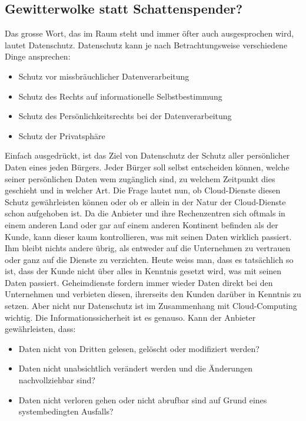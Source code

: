 \subsection{Gewitterwolke statt Schattenspender?}
Das grosse Wort, das im Raum steht und immer öfter auch ausgesprochen wird, lautet Datenschutz. Datenschutz kann je nach Betrachtungsweise verschiedene Dinge ansprechen:

\begin{itemize}
\item Schutz vor missbräuchlicher Datenverarbeitung
\item Schutz des Rechts auf informationelle Selbstbestimmung
\item Schutz des Persönlichkeitsrechts bei der Datenverarbeitung
\item Schutz der Privatsphäre
\end{itemize}

Einfach ausgedrückt, ist das Ziel von Datenschutz der Schutz aller persönlicher Daten eines jeden Bürgers. Jeder Bürger soll selbst entscheiden können, welche seiner persönlichen Daten wem zugänglich sind, zu welchem Zeitpunkt dies geschieht und in welcher Art. Die Frage lautet nun, ob Cloud-Dienste diesen Schutz gewährleisten können oder ob er allein in der Natur der Cloud-Dienste schon aufgehoben ist. Da die Anbieter und ihre Rechenzentren sich oftmals in einem anderen Land oder gar auf einem anderen Kontinent befinden als der Kunde, kann dieser kaum kontrollieren, was mit seinen Daten wirklich passiert. Ihm bleibt nichts andere übrig, als entweder auf die Unternehmen zu vertrauen oder ganz auf die Dienste zu verzichten. Heute weiss man, dass es tatsächlich so ist, dass der Kunde nicht über alles in Kenntnis gesetzt wird, was mit seinen Daten passiert. Geheimdienste fordern immer wieder Daten direkt bei den Unternehmen und verbieten diesen, ihrerseits den Kunden darüber in Kenntnis zu setzen. Aber nicht nur Datenschutz ist im Zusammenhang mit Cloud-Computing wichtig. Die Informationssicherheit ist es genauso.
Kann der Anbieter gewährleisten, dass:

\begin{itemize}
\item Daten nicht von Dritten gelesen, gelöscht oder modifiziert werden?
\item Daten nicht unabsichtlich verändert werden und die Änderungen nachvollziehbar sind?
\item Daten nicht verloren gehen oder nicht abrufbar sind auf Grund eines systembedingten Ausfalls?
\end{itemize}

